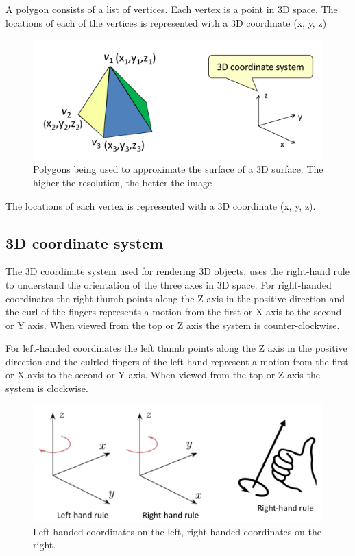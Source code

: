 \documentclass[
]{book}
\begin{document}
A polygon consists of a {list of vertices}. Each vertex is a {point} in 3D space. The locations of each of the vertices is represented with a 3D coordinate {(x, y, z)}

\begin{figure}
\centering
\includegraphics{img/08-image04.png}
\caption{\label{fig:polygon-approx}Polygons being used to approximate the surface of a 3D surface. The higher the resolution, the better the image}
\end{figure}

The locations of each vertex is represented with a 3D coordinate {(x, y, z)}.

\hypertarget{d-coordinate-system}{%
\subsection{3D coordinate system}\label{d-coordinate-system}}

The 3D coordinate system used for rendering 3D objects, uses the right-hand rule to understand the orientation of the three axes in 3D space. For right-handed coordinates the right thumb points along the Z axis in the positive direction and the curl of the fingers represents a motion from the first or X axis to the second or Y axis. When viewed from the top or Z axis the system is counter-clockwise.

For left-handed coordinates the left thumb points along the Z axis in the positive direction and the culrled fingers of the left hand represent a motion from the first or X axis to the second or Y axis. When viewed from the top or Z axis the system is clockwise.

\begin{figure}
\centering
\includegraphics{img/08-image05.png}
\caption{\label{fig:3d-coords}Left-handed coordinates on the left, right-handed coordinates on the right.}
\end{figure}
\end{document}
